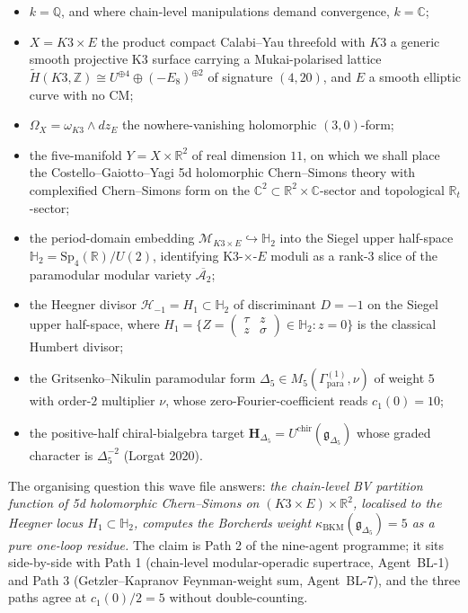 \begin{itemize}
\item $k = \mathbb{Q}$, and where chain-level manipulations demand
convergence, $k = \mathbb{C}$;
\item $X = K3 \times E$ the product compact Calabi--Yau threefold with
$K3$ a generic smooth projective K3 surface carrying a Mukai-polarised
lattice $\widetilde{H}(K3,\mathbb{Z}) \cong U^{\oplus 4} \oplus (-E_8)^{\oplus 2}$
of signature $(4,20)$, and $E$ a smooth elliptic curve with no CM;
\item $\Omega_X = \omega_{K3} \wedge dz_E$ the nowhere-vanishing
holomorphic $(3,0)$-form;
\item the five-manifold $Y = X \times \mathbb{R}^2$ of real dimension
$11$, on which we shall place the Costello--Gaiotto--Yagi 5d holomorphic
Chern--Simons theory with complexified Chern--Simons form on the
$\mathbb{C}^2 \subset \mathbb{R}^2 \times \mathbb{C}$-sector and
topological $\mathbb{R}_t$-sector;
\item the period-domain embedding
$\mathcal{M}_{K3\times E} \hookrightarrow \mathbb{H}_2$ into the Siegel
upper half-space $\mathbb{H}_2 = \mathrm{Sp}_4(\mathbb{R})/U(2)$,
identifying K3-$\times$-$E$ moduli as a rank-$3$ slice of the paramodular
modular variety $\overline{\mathcal{A}_2}$;
\item the Heegner divisor $\mathcal{H}_{-1} = H_1 \subset \mathbb{H}_2$
of discriminant $D = -1$ on the Siegel upper half-space, where
$H_1 = \{ Z = \begin{pmatrix} \tau & z \\ z & \sigma \end{pmatrix} \in \mathbb{H}_2
: z = 0\}$ is the classical Humbert divisor;
\item the Gritsenko--Nikulin paramodular form $\Delta_5 \in
M_5(\Gamma_{\mathrm{para}}^{(1)}, \nu)$ of weight $5$ with order-$2$
multiplier $\nu$, whose zero-Fourier-coefficient reads $c_1(0) = 10$;
\item the positive-half chiral-bialgebra target
$\mathbf{H}_{\Delta_5} = U^{\mathrm{chir}}(\mathfrak{g}_{\Delta_5})$
whose graded character is $\Delta_5^{-2}$ (Lorgat 2020).
\end{itemize}

The organising question this wave file answers: \emph{the chain-level
BV partition function of 5d holomorphic Chern--Simons on
$(K3 \times E) \times \mathbb{R}^2$, localised to the Heegner locus
$H_1 \subset \mathbb{H}_2$, computes the Borcherds weight
$\kappa_{\mathrm{BKM}}(\mathfrak{g}_{\Delta_5}) = 5$ as a pure one-loop
residue.} The claim is Path 2 of the nine-agent programme; it sits
side-by-side with Path 1 (chain-level modular-operadic supertrace,
Agent~BL-1) and Path 3 (Getzler--Kapranov Feynman-weight sum,
Agent~BL-7), and the three paths agree at $c_1(0)/2 = 5$ without
double-counting.


